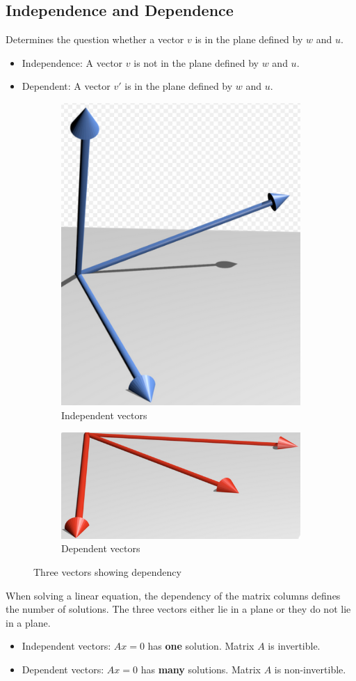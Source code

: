 \documentclass[10pt,a4paper]{article}
\begin{document}
\subsection{Independence and Dependence}
Determines the question whether a vector $v$ is in the plane defined by $w$ and $u$. 
\begin{itemize}
	\item Independence: A vector $v$ is not in the plane defined by $w$ and $u$.
	\item Dependent: A vector $v'$ is in the plane defined by $w$ and $u$.
\end{itemize}
\begin{figure} [h!]
	\centering
	\begin{subfigure}{.5\textwidth}
	  \centering
	  \includegraphics[width=.4\linewidth]{Independent.PNG}
	  \caption{Independent vectors}
	  \label{fig:sub1}
	\end{subfigure}%
	\begin{subfigure}{.5\textwidth}
	  \centering
	  \includegraphics[width=.4\linewidth]{Dependent.PNG}
	  \caption{Dependent vectors}
	  \label{fig:sub2}
	\end{subfigure}
	\caption{Three vectors showing dependency}
	\label{fig:test}
\end{figure}
When solving a linear equation, the dependency of the matrix columns defines the number of
solutions. The three vectors either lie in a plane or they do not lie in a plane.
\begin{itemize}
	\item Independent vectors: $Ax=0$ has \textbf{one} solution. Matrix $A$ is invertible.
	\item Dependent vectors: $Ax=0$ has \textbf{many} solutions. Matrix $A$ is non-invertible.
\end{itemize}
\pagebreak
\end{document}
